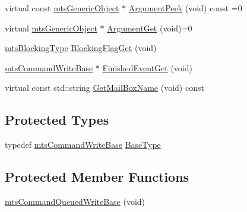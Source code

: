\begin{DoxyCompactItemize}
virtual const \hyperlink{classmts_generic_object}{mts\-Generic\-Object} $\ast$ \hyperlink{classmts_command_queued_write_base_a40aee70e67c7415127e72be05eb6a3a4}{Argument\-Peek} (void) const =0
\item 
virtual \hyperlink{classmts_generic_object}{mts\-Generic\-Object} $\ast$ \hyperlink{classmts_command_queued_write_base_aa13d3a24097258f9975595930d582540}{Argument\-Get} (void)=0
\item 
\hyperlink{mts_forward_declarations_8h_ad7426ccb6c883bc780d0ee197dddcbe7}{mts\-Blocking\-Type} \hyperlink{classmts_command_queued_write_base_aa138c8036f3181703af3395845c92bd0}{Blocking\-Flag\-Get} (void)
\item 
\hyperlink{classmts_command_write_base}{mts\-Command\-Write\-Base} $\ast$ \hyperlink{classmts_command_queued_write_base_a2b0fa088500491f1a6af2d2f01d35733}{Finished\-Event\-Get} (void)
\item 
virtual const std\-::string \hyperlink{classmts_command_queued_write_base_afe6398dca9145cde8de0ba0d8de993df}{Get\-Mail\-Box\-Name} (void) const 
\end{DoxyCompactItemize}
\subsection*{Protected Types}
\begin{DoxyCompactItemize}
\item 
typedef \hyperlink{classmts_command_write_base}{mts\-Command\-Write\-Base} \hyperlink{classmts_command_queued_write_base_aff4a3cf3c103da033abb3cbee439d1ce}{Base\-Type}
\end{DoxyCompactItemize}
\subsection*{Protected Member Functions}
\begin{DoxyCompactItemize}
\item 
\hyperlink{classmts_command_queued_write_base_a37c683e821be080652509253afdf26f4}{mts\-Command\-Queued\-Write\-Base} (void)
\end{DoxyCompactItemize}
